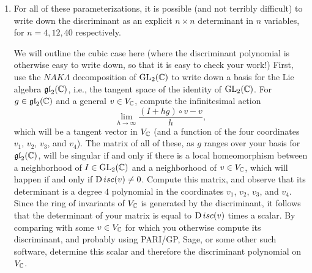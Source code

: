 \documentclass[12pt,amsfont]{amsart}
\begin{document}
\begin{enumerate}
\item For all of these parameterizations, it is possible (and not terribly difficult) to write down the discriminant as an explicit
$n \times n$ determinant in $n$ variables, for $n = 4, 12, 40$ respectively. 

We will outline the cubic case here (where the discriminant polynomial is otherwise easy to write down, so that it is easy 
to check your work!) First, use the $NAK\Lambda$ decomposition
of $\operatorname{GL}_2({\mathbb C})$ to write down a basis for the Lie algebra $\mathfrak{gl}_2({\mathbb C})$, i.e., the tangent space of the identity of
$\operatorname{GL}_2({\mathbb C})$. For $g \in \mathfrak{gl}_2({\mathbb C})$ and a general $v \in V_{{\mathbb C}}$, compute the infinitesimal action
\[
\lim_{h \rightarrow \infty} \frac{ (I + hg) \circ v - v }{h},
\]
which will be a tangent vector in $V_{{\mathbb C}}$ (and a function of the four coordinates $v_1$, $v_2$, $v_3$, and $v_4$). 
The matrix of all of these, as $g$ ranges over your basis for $\mathfrak{gl}_2({\mathbb C})$,
will be singular if and only if there is a local homeomorphism between a neighborhood of $I \in \operatorname{GL}_2({\mathbb C})$ and a neighborhood
of $v \in V_{{\mathbb C}}$, which will happen if and only if ${ {\operatorname Disc}}(v) \neq 0$. Compute this matrix, and observe that its determinant
is a degree $4$ polynomial in the coordinates $v_1$, $v_2$, $v_3$, and $v_4$. Since the ring of invariants of $V_{{\mathbb C}}$ is generated
by the discriminant, it follows that the determinant of your matrix is equal to ${ {\operatorname Disc}}(v)$ times a scalar. By comparing with some
$v \in V_{{\mathbb C}}$ for which you otherwise compute its discriminant, and probably using PARI/GP, Sage, or some other such software,
determine this scalar and therefore the discriminant polynomial on $V_{{\mathbb C}}$.

\end{enumerate}
\end{document}
